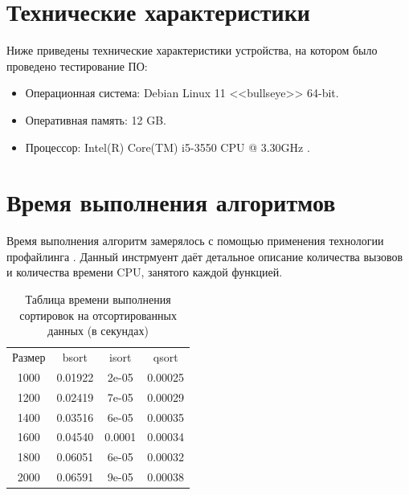 \documentclass[12pt]{report}
\begin{document}
\section{Технические характеристики}

Ниже приведены технические характеристики устройства, на котором было проведено тестирование ПО:

\begin{itemize}
	\item Операционная система: Debian \cite{debian} Linux \cite{linux} 11 <<bullseye>> 64-bit.
	\item Оперативная память: 12 GB.
	\item Процессор: Intel(R) Core(TM) i5-3550 CPU @ 3.30GHz
\cite{i5}.

\end{itemize}

\section{Время выполнения алгоритмов}
Время выполнения алгоритм замерялось с помощью применения технологии профайлинга \cite{profiling}. Данный инстрмуент даёт детальное описание количества вызовов и количества времени CPU, занятого каждой функцией. \newline

\begin{table} [h!]
	\caption{Таблица времени выполнения сортировок на отсортированных данных (в секундах)}
	\begin{center}
	\begin{tabular}{|c c c c|}

		\hline

		Размер & bsort & isort & qsort  \\ [0.5ex]

		1000 & 0.01922 & 2e-05 & 0.00025 \\ 


		\hline 

		1200 & 0.02419 & 7e-05 & 0.00029 \\ 

		\hline 

		1400 & 0.03516 & 6e-05 & 0.00035 \\ 

		\hline 

		1600 & 0.04540 & 0.0001& 0.00034 \\ 

		\hline 

		1800 & 0.06051 & 6e-05 & 0.00032 \\ 

		\hline 

		2000 & 0.06591 & 9e-05 & 0.00038 \\ 

	\hline 

	\end{tabular}
	\end{center}
\end{table}
\end{document}
